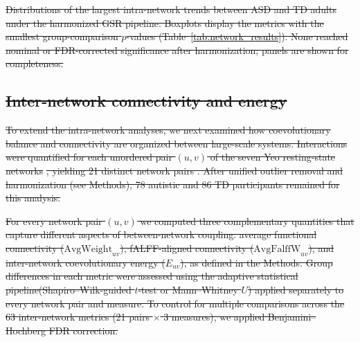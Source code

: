 \documentclass[10pt,letterpaper]{article}
\providecommand{\DIFdeltex}[1]{{\protect\color{red}\sout{#1}}}                      %
\providecommand{\DIFdelbegin}{} %
\providecommand{\DIFdelFL}[1]{\DIFdel{#1}} %
\providecommand{\DIFdel}[1]{\texorpdfstring{\DIFdeltex{#1}}{}} %
\newcommand{\DIFscaledelfig}{0.5}
\newlength{\DIFdelgraphicswidth} %
\newlength{\DIFdelgraphicsheight} %
\newcommand{\DIFdelincludegraphics}[2][]{%
\sbox{\DIFdelgraphicsbox}{\DIFOincludegraphics[#1]{#2}}%
\settoboxwidth{\DIFdelgraphicswidth}{\DIFdelgraphicsbox} %
\settoboxtotalheight{\DIFdelgraphicsheight}{\DIFdelgraphicsbox} %
\scalebox{\DIFscaledelfig}{%
\parbox[b]{\DIFdelgraphicswidth}{\usebox{\DIFdelgraphicsbox}\\[-\baselineskip] \rule{\DIFdelgraphicswidth}{0em}}\llap{\resizebox{\DIFdelgraphicswidth}{\DIFdelgraphicsheight}{%
\setlength{\unitlength}{\DIFdelgraphicswidth}%
\begin{picture}(1,1)%
\thicklines\linethickness{2pt} %
{\color[rgb]{1,0,0}\put(0,0){\framebox(1,1){}}}%
{\color[rgb]{1,0,0}\put(0,0){\line( 1,1){1}}}%
{\color[rgb]{1,0,0}\put(0,1){\line(1,-1){1}}}%
\end{picture}%
}\hspace*{3pt}}} %
} %
\DeclareRobustCommand{\DIFdelbegin}{\DIFOdelbegin \let\includegraphics\DIFdelincludegraphics} %
\begin{document}
\DIFdelbegin %
{%
\DIFdelFL{Distributions of the largest intra-network trends between ASD and TD adults under the
 harmonized GSR pipeline. Boxplots display the metrics with the smallest group-comparison
 $p$-values (Table~\ref{tab:network_results}). None reached nominal or FDR-corrected significance
 after harmonization; panels are shown for completeness.}}

\subsection*{\DIFdel{Inter-network connectivity and energy}}

\DIFdel{To extend the intra-network analyses, we next examined how coevolutionary balance and connectivity
are organized between large-scale systems. Interactions were quantified for each unordered pair
$(u,v)$ of the seven Yeo resting-state networks }%
\DIFdel{, yielding 21 distinct network pairs .
After unified outlier removal and harmonization (see Methods), 78 autistic
and 86 TD participants remained for this analysis.
}%

\DIFdel{For every network pair $(u,v)$ we computed three complementary quantities that capture different
aspects of between-network coupling: average functional connectivity ($\mathrm{AvgWeight}_{uv}$),
fALFF-aligned connectivity ($\mathrm{AvgFalffW}_{uv}$), and inter-network coevolutionary energy
($E_{uv}$),
as defined in the Methods. Group differences in each metric were assessed using the
adaptive statistical pipeline(Shapiro--Wilk-guided $t$-test or Mann--Whitney $U$) applied
separately to every network pair and measure. To control for multiple comparisons across the 63
inter-network metrics (21 pairs $\times$ 3 measures),
we applied Benjamini--Hochberg FDR correction. }%
\end{document}
